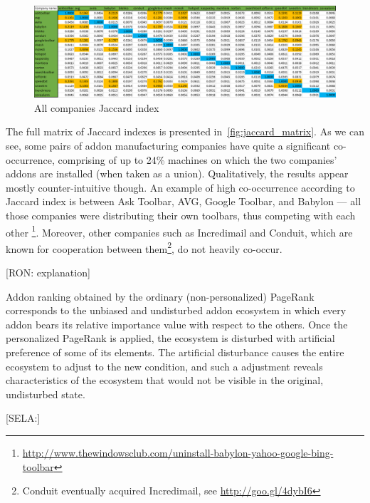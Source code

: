 \documentclass[11pt,oneside]{book}
\begin{document}
\begin{figure}[h]
\centering
\includegraphics[width=\linewidth]{figures/JaccardMatrix.png}
\caption{All companies Jaccard index}
\label{fig:jaccard_matrix}
\end{figure}

The full matrix of Jaccard indexes is presented in~\autoref{fig:jaccard_matrix}. As we can see, some pairs of addon manufacturing companies have quite a significant co-occurrence, comprising of up to 24\% machines on which the two companies' addons are installed (when taken as a union). Qualitatively, the results appear mostly counter-intuitive though. An example of high co-occurrence according to Jaccard index is between Ask Toolbar, AVG, Google Toolbar, and Babylon --- all those companies were distributing their own toolbars, thus competing with each other \footnote{\url{http://www.thewindowsclub.com/uninstall-babylon-yahoo-google-bing-toolbar}}. Moreover, other companies such as Incredimail and Conduit, which are known for cooperation between them\footnote{Conduit eventually acquired Incredimail, see \url{http://goo.gl/4dybI6}}, do not heavily co-occur.

[RON: explanation]

Addon ranking obtained by the ordinary (non-personalized) PageRank corresponds to the unbiased and undisturbed addon ecosystem in which every addon bears its relative importance value with respect to the others. Once the personalized PageRank is applied, the ecosystem is disturbed with artificial preference of some of its elements. The artificial disturbance causes the entire ecosystem to adjust to the new condition, and such a adjustment reveals characteristics of the ecosystem that would not be visible in the original, undisturbed state. 

[SELA:]
\end{document}
